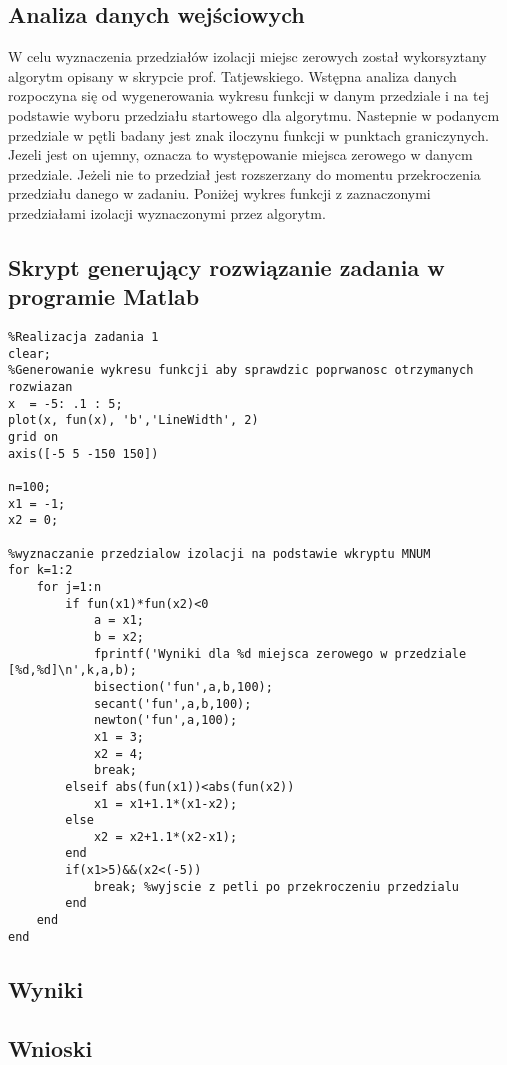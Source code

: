 \documentclass[a4paper, 11pt]{article}
\begin{document}
\subsection{Analiza danych wejściowych}
W celu wyznaczenia przedziałów izolacji miejsc zerowych został wykorsyztany algorytm opisany w skrypcie prof. Tatjewskiego. Wstępna analiza danych rozpoczyna się od wygenerowania wykresu funkcji w danym przedziale i na tej podstawie wyboru przedziału startowego dla algorytmu. Nastepnie w podanycm przedziale w pętli badany jest znak iloczynu funkcji w punktach graniczynych. Jezeli jest on ujemny, oznacza to występowanie miejsca zerowego w danycm przedziale. Jeżeli nie to przedział jest rozszerzany do momentu przekroczenia przedziału danego w zadaniu. 
Poniżej wykres funkcji z zaznaczonymi przedziałami izolacji wyznaczonymi przez algorytm. 


\subsection{Skrypt generujący rozwiązanie zadania w programie Matlab}
\begin{lstlisting}
%Realizacja zadania 1
clear; 
%Generowanie wykresu funkcji aby sprawdzic poprwanosc otrzymanych rozwiazan 
x  = -5: .1 : 5;
plot(x, fun(x), 'b','LineWidth', 2)
grid on
axis([-5 5 -150 150])

n=100; 
x1 = -1; 
x2 = 0; 

%wyznaczanie przedzialow izolacji na podstawie wkryptu MNUM
for k=1:2
    for j=1:n
        if fun(x1)*fun(x2)<0
            a = x1;
            b = x2;
            fprintf('Wyniki dla %d miejsca zerowego w przedziale [%d,%d]\n',k,a,b);
            bisection('fun',a,b,100);
            secant('fun',a,b,100);
            newton('fun',a,100);
            x1 = 3; 
            x2 = 4; 
            break;
        elseif abs(fun(x1))<abs(fun(x2))
            x1 = x1+1.1*(x1-x2);
        else
            x2 = x2+1.1*(x2-x1);
        end
        if(x1>5)&&(x2<(-5))
            break; %wyjscie z petli po przekroczeniu przedzialu
        end
    end
end
\end{lstlisting}
\vspace{1cm}


\subsection{Wyniki}


\subsection{Wnioski}
\end{document}
